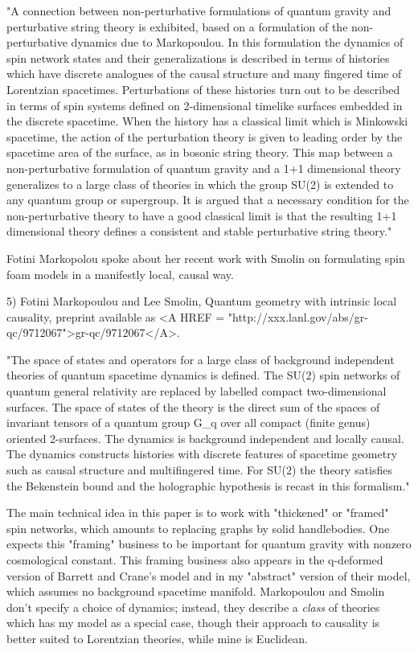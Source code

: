 "A connection between non-perturbative formulations of quantum gravity
and perturbative string theory is exhibited, based on a formulation of
the non-perturbative dynamics due to Markopoulou.  In this formulation
the dynamics of spin network states and their generalizations is
described in terms of histories which have discrete analogues of the
causal structure and many fingered time of Lorentzian spacetimes.
Perturbations of these histories turn out to be described in terms of
spin systems defined on 2-dimensional timelike surfaces embedded in the
discrete spacetime. When the history has a classical limit which is
Minkowski spacetime, the action of the perturbation theory is given to
leading order by the spacetime area of the surface, as in bosonic string
theory.  This map between a non-perturbative formulation of quantum
gravity and a 1+1 dimensional theory generalizes to a large class of
theories in which the group SU(2) is extended to any quantum group or
supergroup.  It is argued that a necessary condition for the
non-perturbative theory to have a good classical limit is that the
resulting 1+1 dimensional theory defines a consistent and stable
perturbative string theory."

Fotini Markopolou spoke about her recent work with Smolin on
formulating spin foam models in a manifestly local, causal
way.  

5) Fotini Markopoulou and Lee Smolin, Quantum geometry with intrinsic
local causality, preprint available as <A HREF = "http://xxx.lanl.gov/abs/gr-qc/9712067">gr-qc/9712067</A>.

"The space of states and operators for a large class of background
independent theories of quantum spacetime dynamics is defined.  The SU(2)
spin networks of quantum general relativity are replaced by labelled
compact two-dimensional surfaces.  The space of states of the theory is
the direct sum of the spaces of invariant tensors of a quantum group G_q
over all compact (finite genus) oriented 2-surfaces.  The dynamics is
background independent and locally causal. The dynamics constructs
histories with discrete features of spacetime geometry such as causal
structure and multifingered time.  For SU(2) the theory satisfies the
Bekenstein bound and the holographic hypothesis is recast in this
formalism."

The main technical idea in this paper is to work with "thickened" or
"framed" spin networks, which amounts to replacing graphs by
solid handlebodies.  One expects this "framing" business to be
important for quantum gravity with nonzero cosmological constant.  
This framing business also appears in the q-deformed version of 
Barrett and Crane's model and in my "abstract" version of 
their model, which assumes no background spacetime manifold.
Markopoulou and Smolin don't specify a choice of dynamics; instead,
they describe a \emph{class} of theories which has my model as a
special case, though their approach to causality is better suited
to Lorentzian theories, while mine is Euclidean.   

